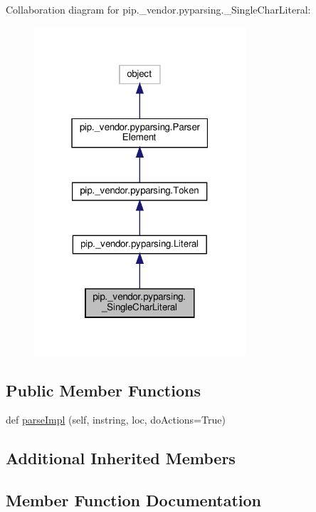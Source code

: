 Collaboration diagram for pip.\+\_\+vendor.\+pyparsing.\+\_\+\+Single\+Char\+Literal\+:
\nopagebreak
\begin{figure}[H]
\begin{center}
\leavevmode
\includegraphics[width=223pt]{classpip_1_1__vendor_1_1pyparsing_1_1__SingleCharLiteral__coll__graph}
\end{center}
\end{figure}
\subsection*{Public Member Functions}
\begin{DoxyCompactItemize}
\item 
def \hyperlink{classpip_1_1__vendor_1_1pyparsing_1_1__SingleCharLiteral_a7a81d2e8fdd64416efe827cc41f85d44}{parse\+Impl} (self, instring, loc, do\+Actions=True)
\end{DoxyCompactItemize}
\subsection*{Additional Inherited Members}


\subsection{Member Function Documentation}
\mbox{\label{classpip_1_1__vendor_1_1pyparsing_1_1__SingleCharLiteral_a7a81d2e8fdd64416efe827cc41f85d44}} 
